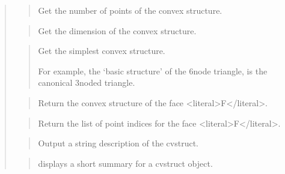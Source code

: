 \documentclass[a4paper,11pt,english]{sphinxmanual}
\begin{document}
\sphinxAtStartPar
{}
\begin{quote}

\sphinxAtStartPar
{}
\begin{quote}

\sphinxAtStartPar
Get the number of points of the convex structure.
\end{quote}

\sphinxAtStartPar
{}
\begin{quote}

\sphinxAtStartPar
Get the dimension of the convex structure.
\end{quote}

\sphinxAtStartPar
{}
\begin{quote}

\sphinxAtStartPar
Get the simplest convex structure.

\sphinxAtStartPar
For example, the ‘basic structure’ of the 6\sphinxhyphen{}node triangle, is the
canonical 3\sphinxhyphen{}noded triangle.
\end{quote}

\sphinxAtStartPar
{}
\begin{quote}

\sphinxAtStartPar
Return the convex structure of the face \textless{}literal\textgreater{}F\textless{}/literal\textgreater{}.
\end{quote}

\sphinxAtStartPar
{}
\begin{quote}

\sphinxAtStartPar
Return the list of point indices for the face \textless{}literal\textgreater{}F\textless{}/literal\textgreater{}.
\end{quote}

\sphinxAtStartPar
{}
\begin{quote}

\sphinxAtStartPar
Output a string description of the cvstruct.
\end{quote}

\sphinxAtStartPar
{}
\begin{quote}

\sphinxAtStartPar
displays a short summary for a cvstruct object.
\end{quote}
\end{quote}
\end{document}
